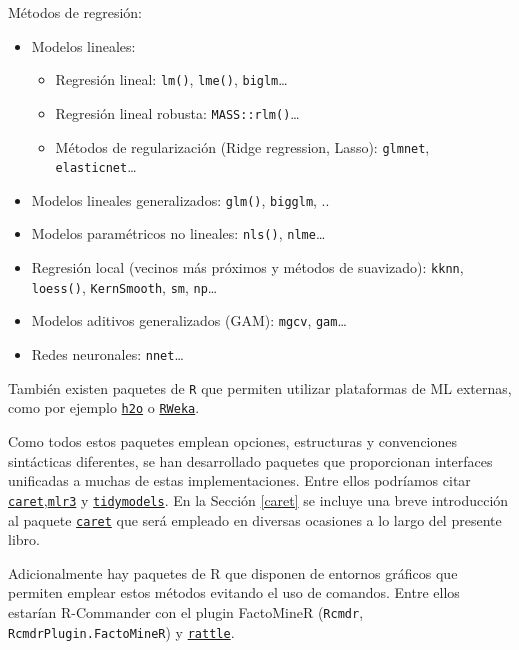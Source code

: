 \documentclass[]{book}
\theoremstyle{break}
\theoremstyle{definition}
\theoremstyle{definition}
\theoremstyle{definition}
\theoremstyle{remark}
\begin{document}
Métodos de regresión:

\begin{itemize}
\item
  Modelos lineales:

  \begin{itemize}
  \item
    Regresión lineal: \texttt{lm()}, \texttt{lme()},
    \texttt{biglm}\ldots{}
  \item
    Regresión lineal robusta: \texttt{MASS::rlm()}\ldots{}
  \item
    Métodos de regularización (Ridge regression, Lasso):
    \texttt{glmnet}, \texttt{elasticnet}\ldots{}
  \end{itemize}
\item
  Modelos lineales generalizados: \texttt{glm()}, \texttt{bigglm}, ..
\item
  Modelos paramétricos no lineales: \texttt{nls()},
  \texttt{nlme}\ldots{}
\item
  Regresión local (vecinos más próximos y métodos de suavizado):
  \texttt{kknn}, \texttt{loess()}, \texttt{KernSmooth}, \texttt{sm},
  \texttt{np}\ldots{}
\item
  Modelos aditivos generalizados (GAM): \texttt{mgcv},
  \texttt{gam}\ldots{}
\item
  Redes neuronales: \texttt{nnet}\ldots{}
\end{itemize}

También existen paquetes de \texttt{R} que permiten utilizar plataformas
de ML externas, como por ejemplo
\href{https://github.com/h2oai/h2o-3/tree/master/h2o-r}{\texttt{h2o}} o
\href{https://CRAN.R-project.org/package=RWeka}{\texttt{RWeka}}.

Como todos estos paquetes emplean opciones, estructuras y convenciones
sintácticas diferentes, se han desarrollado paquetes que proporcionan
interfaces unificadas a muchas de estas implementaciones. Entre ellos
podríamos citar
\href{https://topepo.github.io/caret}{\texttt{caret}},\href{https://mlr3.mlr-org.com}{\texttt{mlr3}}
y \href{https://www.tidymodels.org}{\texttt{tidymodels}}. En la Sección
\ref{caret} se incluye una breve introducción al paquete
\href{https://topepo.github.io/caret}{\texttt{caret}} que será empleado
en diversas ocasiones a lo largo del presente libro.

Adicionalmente hay paquetes de R que disponen de entornos gráficos que
permiten emplear estos métodos evitando el uso de comandos. Entre ellos
estarían R-Commander con el plugin FactoMineR (\texttt{Rcmdr},
\texttt{RcmdrPlugin.FactoMineR}) y
\href{https://rattle.togaware.com}{\texttt{rattle}}.
\end{document}
